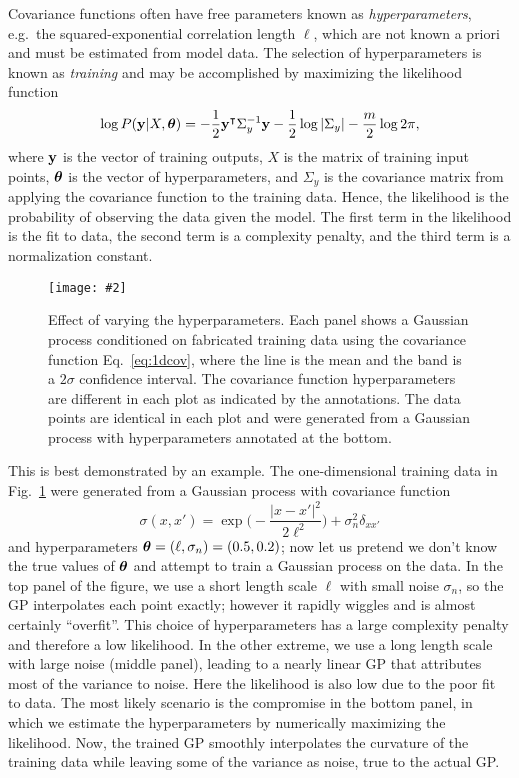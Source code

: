 \documentclass[aps,prc,reprint,superscriptaddress,amsmath]{revtex4-1}
\newcommand{\colfig}[3][t]{
  \begin{figure}[#1]
    \texttt{[image: \#2]}
    \caption{\label{fig:#2}#3}
  \end{figure}
}
\newcommand{\tran}{^\intercal}
\begin{document}
Covariance functions often have free parameters known as \emph{hyperparameters}, e.g.\ the squared-exponential correlation length $\ell$,
which are not known a priori and must be estimated from model data.
The selection of hyperparameters is known as \emph{training} and may be accomplished by maximizing the likelihood function \cite{Rasmussen:2006gp}
\begin{equation}
  \log P(\y|X,\vectheta) = -\frac{1}{2} \y\tran \Sigma_y^{-1} \y - \frac{1}{2} \log |\Sigma_y| - \frac{m}{2} \log 2\pi,
  \label{eq:train_like}
\end{equation}
where $\mathbf y$ is the vector of training outputs, $X$ is the matrix of training input points, $\boldsymbol\theta$ is the vector of hyperparameters, and $\Sigma_y$ is the covariance matrix from applying the covariance function to the training data.
Hence, the likelihood is the probability of observing the data given the model.
The first term in the likelihood is the fit to data, the second term is a complexity penalty, and the third term is a normalization constant.

\colfig{training}{
  Effect of varying the hyperparameters.
  Each panel shows a Gaussian process conditioned on fabricated training data using the covariance function Eq.~\eqref{eq:1dcov}, where the line is the mean and the band is a $2\sigma$ confidence interval.
  The covariance function hyperparameters are different in each plot as indicated by the annotations.
  The data points are identical in each plot and were generated from a Gaussian process with hyperparameters annotated at the bottom.
}

This is best demonstrated by an example.
The one-dimensional training data in Fig.~\ref{fig:training} were generated from a Gaussian process with covariance function
\begin{equation}
  \sigma(x, x') = \exp\biggl( -\frac{|x - x'|^2}{2\ell^2} \biggr) + \sigma_n^2\delta_{xx'}
  \label{eq:1dcov}
\end{equation}
and hyperparameters $\boldsymbol\theta = (\ell, \sigma_n) = (0.5, 0.2)$; now let us pretend we don't know the true values of $\boldsymbol\theta$ and attempt to train a Gaussian process on the data.
In the top panel of the figure, we use a short length scale $\ell$ with small noise $\sigma_n$, so the GP interpolates each point exactly; however it rapidly wiggles and is almost certainly ``overfit''.
This choice of hyperparameters has a large complexity penalty and therefore a low likelihood.
In the other extreme, we use a long length scale with large noise (middle panel), leading to a nearly linear GP that attributes most of the variance to noise.
Here the likelihood is also low due to the poor fit to data.
The most likely scenario is the compromise in the bottom panel, in which we estimate the hyperparameters by numerically maximizing the likelihood.
Now, the trained GP smoothly interpolates the curvature of the training data while leaving some of the variance as noise, true to the actual GP.
\end{document}
